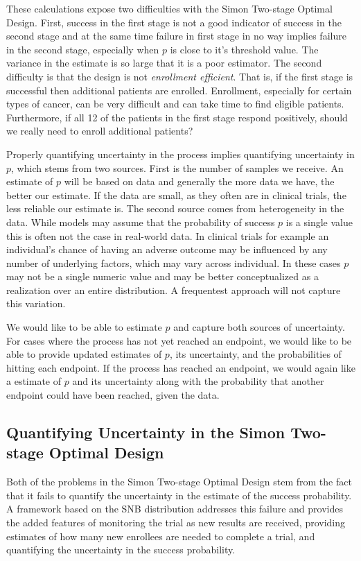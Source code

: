 \documentclass[12pt]{article}         %
\begin{document}
These calculations expose two difficulties with the Simon Two-stage Optimal 
Design. First, success in the first stage is not a good indicator of success 
in the second stage and at the same time failure in first stage in no way 
implies failure in the second stage, especially when $p$ is close to it's 
threshold value. The variance in the estimate is so large that it is a poor 
estimator. The second difficulty is that the design is not {\em enrollment 
efficient}. That is, if the first stage is successful then additional patients 
are enrolled. Enrollment, especially for certain types of cancer, can be very 
difficult and can take time to find eligible patients. Furthermore, if 
all 12 of the patients in the first stage respond positively, should we 
really need to enroll additional patients?

Properly quantifying uncertainty in the process implies quantifying 
uncertainty in $p$, which stems from two sources. First is the number of 
samples we receive. An estimate of $p$ will be based on data and generally 
the more data we have, the better our estimate. If the data are small, as 
they often are in clinical trials, the less reliable our estimate is. The 
second source comes from heterogeneity in the data. While models may assume 
that the probability of success $p$ is a single value this is often not the 
case in real-world data. In clinical trials for example an individual's chance 
of having an adverse outcome may be influenced by any number of underlying 
factors, which may vary across individual. In these cases $p$ may not be a 
single numeric value and may be better conceptualized as a realization over 
an entire distribution. A frequentest approach will not capture this variation.

We would like to be able to estimate $p$ and capture both sources of uncertainty. For cases where the process has not yet reached an endpoint, we would like to be able to provide updated estimates of $p$, its uncertainty, and the probabilities of hitting each endpoint. If the process has reached an endpoint, we would again like a estimate of $p$ and its uncertainty along with the probability that another endpoint could have been reached, given the data. 

\subsection{Quantifying Uncertainty in the Simon Two-stage Optimal Design}

Both of the problems in the Simon Two-stage Optimal Design stem from the fact that it fails to quantify the uncertainty in the estimate of the success probability. A framework based on the SNB distribution addresses this failure and 
provides the added features of monitoring the trial as new results are 
received, providing estimates of how many new enrollees are needed to complete 
a trial, and quantifying the uncertainty in the success probability.
\end{document}

